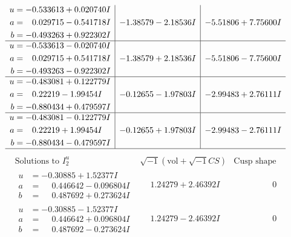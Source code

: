 \documentclass[1p]{elsarticle_modified}
\theoremstyle{definition}
\newcommand{\I}{\sqrt{-1}}
\begin{document}
$$\begin{array}{c|c|c}
\begin{aligned}
u &= -0.533613 + 0.020740 I \\
a &= \phantom{-}0.029715 - 0.541718 I \\
b &= -0.493263 + 0.922302 I\end{aligned}
 & -1.38579 - 2.18536 I & -5.51806 + 7.75600 I \\ \hline\begin{aligned}
u &= -0.533613 - 0.020740 I \\
a &= \phantom{-}0.029715 + 0.541718 I \\
b &= -0.493263 - 0.922302 I\end{aligned}
 & -1.38579 + 2.18536 I & -5.51806 - 7.75600 I \\ \hline\begin{aligned}
u &= -0.483081 + 0.122779 I \\
a &= \phantom{-}0.22219 - 1.99454 I \\
b &= -0.880434 + 0.479597 I\end{aligned}
 & -0.12655 - 1.97803 I & -2.99483 + 2.76111 I \\ \hline\begin{aligned}
u &= -0.483081 - 0.122779 I \\
a &= \phantom{-}0.22219 + 1.99454 I \\
b &= -0.880434 - 0.479597 I\end{aligned}
 & -0.12655 + 1.97803 I & -2.99483 - 2.76111 I\\
 \hline 
 \end{array}$$\newpage$$\begin{array}{c|c|c}  
\text{Solutions to }I^u_{2}& \I (\text{vol} + \sqrt{-1}CS) & \text{Cusp shape}\\
 \hline 
\begin{aligned}
u &= -0.30885 + 1.52377 I \\
a &= \phantom{-}0.446642 - 0.096804 I \\
b &= \phantom{-}0.487692 + 0.273624 I\end{aligned}
 & \phantom{-}1.24279 + 2.46392 I & \phantom{-0.000000 } 0 \\ \hline\begin{aligned}
u &= -0.30885 - 1.52377 I \\
a &= \phantom{-}0.446642 + 0.096804 I \\
b &= \phantom{-}0.487692 - 0.273624 I\end{aligned}
 & \phantom{-}1.24279 - 2.46392 I & \phantom{-0.000000 } 0 \\ \hline\begin{aligned}

\end{aligned}
\end{array}$$
\end{document}
